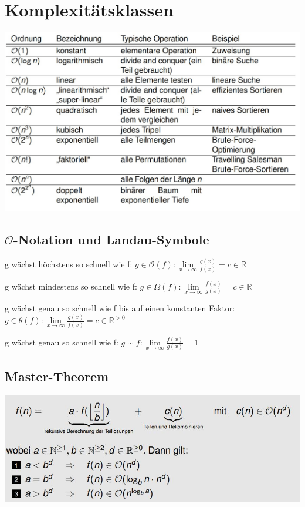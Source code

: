 \documentclass[12pt]{article}
\begin{document}
\section{Komplexitätsklassen}

\includegraphics[scale=0.4]{KK}

\subsection{$\mathcal{O}$-Notation und Landau-Symbole}

g wächst höchstens so schnell wie f: \newline
 $ g \in \mathcal{O}(f): \lim \limits_{x \to \infty} \frac{g(x)}{f(x)} = c \in \mathbb{R} $ \hfill \break

g wächst mindestens so schnell wie f:\newline
 $ g \in\Omega(f): \lim \limits_{x \to \infty} \frac{f(x)}{g(x)} = c \in \mathbb{R} $ \hfill \break
 

g wächst genau so schnell wie f bis auf einen konstanten Faktor:\newline
$ g \in \theta (f): \lim \limits_{x \to \infty} \frac{g(x)}{f(x)} = c \in \mathbb{R}^{>0} $ \hfill \break



g wächst genau so schnell wie f: \newline
$ g \sim f: \lim \limits_{x \to \infty} \frac{f(x)}{g(x)} = 1 $ \hfill \break

\subsection{Master-Theorem}

\includegraphics{Master}
\newpage
\end{document}
